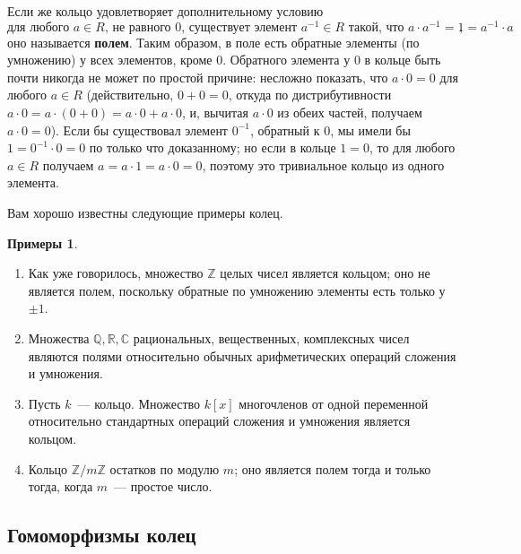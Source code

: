 \documentclass[a4paper,11pt]{scrartcl}
\theoremstyle{plain}
\theoremstyle{definition}
\newtheorem{examples}[theorem]{Примеры}
\newcommand\dfn[1]{\textbf{#1}}
\newcommand\mb{\mathbb}
\begin{document}
Если же кольцо удовлетворяет дополнительному условию
$$
\text{для любого $a\in R$, не равного $0$, существует элемент
  $a^{-1}\in R$ такой, что $a\cdot a^{-1}=1=a^{-1}\cdot a$},
$$
оно называется \dfn{полем}. Таким образом, в поле есть обратные
элементы (по умножению) у всех элементов, кроме $0$. Обратного
элемента у 0 в кольце быть почти никогда не может по простой причине:
несложно показать, что $a\cdot 0=0$ для любого $a\in R$
(действительно, $0+0=0$, откуда по дистрибутивности $a\cdot 0=a\cdot
(0+0)=a\cdot 0+a\cdot 0$, и, вычитая $a\cdot 0$ из обеих частей,
получаем $a\cdot 0=0$). Если бы существовал элемент $0^{-1}$, обратный
к 0, мы имели бы $1=0^{-1}\cdot 0=0$ по только что доказанному; но
если в кольце $1=0$, то для любого $a\in R$ получаем $a=a\cdot
1=a\cdot 0=0$, поэтому это тривиальное кольцо из одного элемента.

Вам хорошо известны следующие примеры колец.
\begin{examples}
\begin{enumerate}
\item Как уже говорилось, множество $\mb Z$ целых чисел является
  кольцом; оно не является полем, поскольку обратные по умножению
  элементы есть только у $\pm 1$.
\item Множества $\mb Q, \mb R, \mb C$ рациональных, вещественных,
  комплексных чисел являются полями относительно обычных
  арифметических операций сложения и умножения.
\item Пусть $k$~--- кольцо. Множество $k[x]$ многочленов от
  одной переменной относительно стандартных операций сложения и
  умножения является кольцом.
\item Кольцо $\mb Z/m\mb Z$ остатков по модулю $m$; оно является полем
  тогда и только тогда, когда $m$~--- простое число.
\end{enumerate}
\end{examples}

\subsection{Гомоморфизмы колец}
\end{document}
